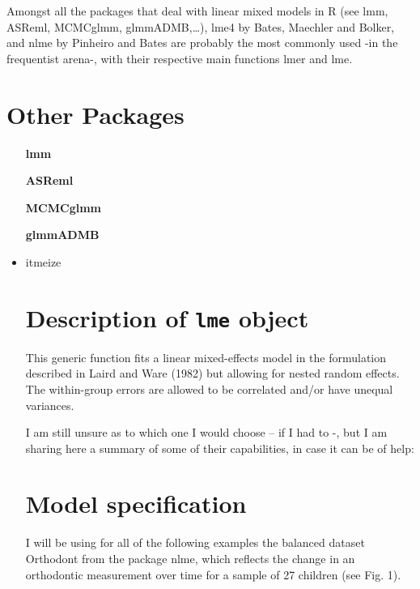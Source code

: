 Amongst all the packages that deal with linear mixed models in R (see lmm, ASReml, MCMCglmm, glmmADMB,…), lme4 by  Bates, Maechler and Bolker, and nlme by Pinheiro and Bates are probably the most commonly used -in the frequentist arena-, with their respective main functions lmer and lme.


\section*{Other Packages}

\begin{itemize}
\item[\textbf{lmm}] 
\item[\textbf{ASReml}]
\item[\textbf{MCMCglmm}]
\item[\textbf{glmmADMB}]
\item{itmeize}


\section*{Description of \texttt{lme} object}

This generic function fits a linear mixed-effects model in the formulation described in Laird and Ware (1982) but allowing for nested random effects. 
The within-group errors are allowed to be correlated and/or have unequal variances.

I am still unsure as to which one I would choose – if I had to -, but I am sharing here a summary of some of their capabilities, in case it can be of help:

\section*{Model specification}

I will be using for all of the following examples the balanced dataset Orthodont from the package nlme, which reflects the change in an orthodontic measurement over time for a sample of 27 children (see Fig. 1).


\end{itemize}
